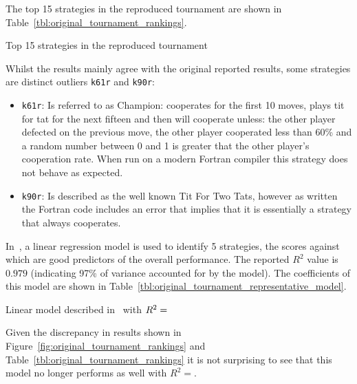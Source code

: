 \documentclass{article}
\begin{document}
The top 15 strategies in the reproduced tournament are shown in
Table~\ref{tbl:original_tournament_rankings}.

\begin{table}[!hbtp]
        \centering
        
        \caption{Top 15 strategies in the reproduced tournament}
        \label{tbl:original_tournament_rankings}
\end{table}

Whilst the results mainly agree with the original reported results, some
strategies are distinct outliers \texttt{k61r} and \texttt{k90r}:

\begin{itemize}
    \item \texttt{k61r}: Is referred to as Champion: cooperates for the first 10
        moves, plays tit for tat for the next fifteen and then will cooperate
        unless: the other player defected on the previous move, the
        other player cooperated less than 60\% and a random number between
        0 and 1 is greater that the other player's cooperation rate.
        When run on a modern Fortran compiler this strategy does not behave as
        expected.
    \item \texttt{k90r}: Is described as the well known Tit For Two Tats,
        however as written the Fortran code includes an error that implies that
        it is essentially a strategy that always cooperates.
\end{itemize}

In~\cite{Axelrod1980b}, a linear regression model is used to identify 5
strategies, the scores against which are good predictors of the overall
performance. The reported \(R^2\) value is \(0.979\) (indicating 97\% of
variance accounted for by the model). The coefficients of this model are shown
in Table~\ref{tbl:original_tournament_representative_model}.

\begin{table}[!hbtp]
        \centering
        
        \caption{Linear model described in~\cite{Axelrod1980b} with
             \(R^2=\protect\)}
        \label{tbl:original_tournament_representative_model}
\end{table}

Given the discrepancy in results shown in
Figure~\ref{fig:original_tournament_rankings} and
Table~\ref{tbl:original_tournament_rankings} it is not surprising to see that
this model no longer performs as well with
\(R^2=\).
\end{document}
